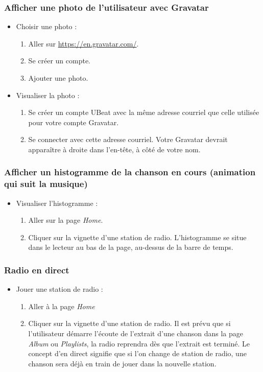 \documentclass[12pt, letterpaper]{article}
\begin{document}
    \subsubsection*{Afficher une photo de l’utilisateur avec Gravatar}
    \begin{itemize}
        \item Choisir une photo :
        \begin{enumerate}
            \item Aller sur \url{https://en.gravatar.com/}.
            \item Se créer un compte.
            \item Ajouter une photo.
        \end{enumerate}

        \item Visualiser la photo :
        \begin{enumerate}
            \item Se créer un compte UBeat avec la même adresse courriel que celle utilisée pour votre compte Gravatar.
            \item Se connecter avec cette adresse courriel. Votre Gravatar devrait apparaître à droite dans l'en-tête, à côté de votre nom.
        \end{enumerate}
    \end{itemize}
    
    \subsubsection*{Afficher un histogramme de la chanson en cours (animation qui suit la musique)}
    \begin{itemize}
        \item Visualiser l'histogramme :
        \begin{enumerate}
            \item Aller sur la page \textit{Home}.
            \item Cliquer sur la vignette d'une station de radio. L'histogramme se situe dans le lecteur au bas de la page, au-dessus de la barre de temps.
        \end{enumerate}
    \end{itemize}

    \subsubsection*{Radio en direct}
    \begin{itemize}
        \item Jouer une station de radio :
        \begin{enumerate}
            \item Aller à la page \textit{Home}
            \item Cliquer sur la vignette d'une station de radio. Il est prévu que si l'utilisateur démarre l'écoute de l'extrait d'une chanson dans la page \textit{Album} ou \textit{Playlists}, la radio reprendra dès que l'extrait est terminé. Le concept d'en direct signifie que si l'on change de station de radio, une chanson sera déjà en train de jouer dans la nouvelle station.
        \end{enumerate}
    \end{itemize}
\end{document}
